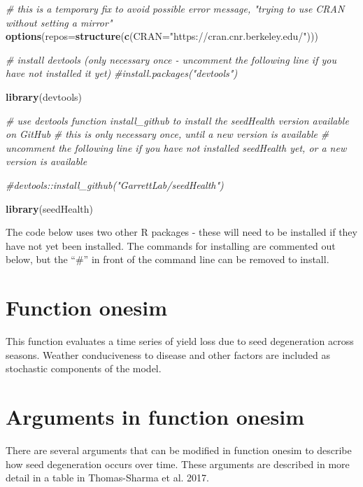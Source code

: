 \documentclass[]{article}
\newenvironment{Shaded}{\begin{snugshade}}{\end{snugshade}}
\newcommand{\KeywordTok}[1]{\textcolor[rgb]{0.13,0.29,0.53}{\textbf{#1}}}
\newcommand{\DataTypeTok}[1]{\textcolor[rgb]{0.13,0.29,0.53}{#1}}
\newcommand{\StringTok}[1]{\textcolor[rgb]{0.31,0.60,0.02}{#1}}
\newcommand{\CommentTok}[1]{\textcolor[rgb]{0.56,0.35,0.01}{\textit{#1}}}
\newcommand{\NormalTok}[1]{#1}
\begin{document}
\begin{Shaded}
\begin{Highlighting}[]
\CommentTok{# this is a temporary fix to avoid possible error message, "trying to use CRAN without setting a mirror"}
\KeywordTok{options}\NormalTok{(}\DataTypeTok{repos=}\KeywordTok{structure}\NormalTok{(}\KeywordTok{c}\NormalTok{(}\DataTypeTok{CRAN=}\StringTok{"https://cran.cnr.berkeley.edu/"}\NormalTok{)))}

\CommentTok{# install devtools (only necessary once - uncomment the following line if you have not installed it yet)}
\CommentTok{#install.packages("devtools")}

\KeywordTok{library}\NormalTok{(devtools)}

\CommentTok{# use devtools function install_github to install the seedHealth version available on GitHub}
\CommentTok{# this is only necessary once, until a new version is available}
\CommentTok{# uncomment the following line if you have not installed seedHealth yet, or a new version is available}

\CommentTok{#devtools::install_github("GarrettLab/seedHealth")}

\KeywordTok{library}\NormalTok{(seedHealth)}
\end{Highlighting}
\end{Shaded}

The code below uses two other R packages - these will need to be
installed if they have not yet been installed. The commands for
installing are commented out below, but the ``\#'' in front of the
command line can be removed to install.

\section{Function onesim}\label{function-onesim}

This function evaluates a time series of yield loss due to seed
degeneration across seasons. Weather conduciveness to disease and other
factors are included as stochastic components of the model.

\section{Arguments in function
onesim}\label{arguments-in-function-onesim}

There are several arguments that can be modified in function onesim to
describe how seed degeneration occurs over time. These arguments are
described in more detail in a table in Thomas-Sharma et al. 2017.
\end{document}
